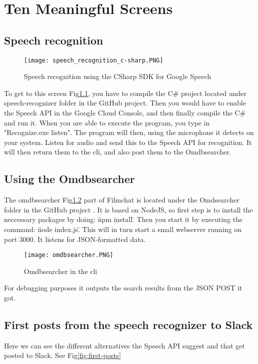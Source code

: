 \documentclass[11pt,fleqn]{book} %
\begin{document}

\chapter{Ten Meaningful Screens}
\section{Speech recognition}
\begin{figure}[]
  \centering
   \texttt{[image: speech\_recognition\_c-sharp.PNG]}
  \caption{Speech recognition using the CSharp SDK for Google Speech}
  \label{fig:c-sharp-speech}
\end{figure}
To get to this screen Fig\ref{fig:c-sharp-speech}, you have to compile the C\# project located under speech-recognizer folder in the GitHub project. \cite{Github2017GitHubProject}
Then you would have to enable the Speech API in the Google Cloud Console, and then finally compile the C\# and run it.
When you are able to execute the program, you type in "Recognize.exe listen". The program will then, using the microphone it detects on your system. Listen for audio and send this to the Speech API for recognition. It will then return them to the cli, and also post them to the Omdbsearcher.

\newpage
\section{Using the Omdbsearcher}
The omdbsearcher Fig\ref{fig:omdbsearcher} part of Filmchat is located under the Omdsearcher folder in the GitHub project \cite{Github2017GitHubProject}. It is based on NodeJS, so first step is to install the neccessary packages by doing: \"npm install\". Then you start it by executing the command: \"node index.js\". This will in turn start a small webserver running on port 3000.
It listens for JSON-formatted data.
\begin{figure}[]
  \centering
   \texttt{[image: omdbsearcher.PNG]}
  \caption{Omdbsearcher in the cli}
  \label{fig:omdbsearcher}
\end{figure}
For debugging purposes it outputs the search results from the JSON POST it got.

\newpage
\section{First posts from the speech recognizer to Slack}
Here we can see the different alternatives the Speech API suggest and that get posted to Slack. See Fig\ref{fig:first-posts}
\end{document}
